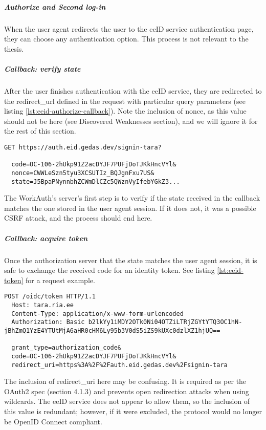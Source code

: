 \subparagraph{Authorize and Second log-in}

When the user agent redirects the user to the eeID service authentication page, they can choose any authentication option. This process is not relevant to the thesis.

\subparagraph{Callback: verify state}

After the user finishes authentication with the eeID service, they are redirected to the redirect\_url defined in the request with particular query parameters (see listing \ref{lst:eeid-authorize-callback}). Note the inclusion of nonce, as this value should not be here \cite{okta-oidc-spec} (see Discovered Weaknesses section), and we will ignore it for the rest of this section.

\begin{lstlisting}[caption={The eeID service authorize redirect response}, label={lst:eeid-authorize-callback}]
  GET https://auth.eid.gedas.dev/signin-tara?
  
  code=OC-106-2hUkp91Z2acDYJF7PUFjDoTJKkHncVYl&
  nonce=CWWLeSzn5tyu3XCSUTIz_BQJgnFxu7US&
  state=J5BpaPNynnbhZCWmDlCZc5QWznVyIfebYGkZ3...
\end{lstlisting}

The WorkAuth's server's first step is to verify if the state received in the callback matches the one stored in the user agent session. If it does not, it was a possible CSRF attack, and the process should end here.

\subparagraph{Callback: acquire token}

Once the authorization server that the state matches the user agent session, it is safe to exchange the received code for an identity token. See listing \ref{lst:eeid-token} for a request example.

\begin{lstlisting}[caption={The eeID service token request}, label={lst:eeid-token}]
  POST /oidc/token HTTP/1.1
  Host: tara.ria.ee
  Content-Type: application/x-www-form-urlencoded
  Authorization: Basic b2lkYy1iMDY2OTk0Ni04OTZiLTRjZGYtYTQ3OC1hN-jBhZmQ1YzE4YTUtMjA6aHR0cHM6Ly95b3V0dS5iZS9kUXc0dzlXZ1hjUQ==

  grant_type=authorization_code&
  code=OC-106-2hUkp91Z2acDYJF7PUFjDoTJKkHncVYl&
  redirect_uri=https%3A%2F%2Fauth.eid.gedas.dev%2Fsignin-tara
\end{lstlisting}

The inclusion of redirect\_uri here may be confusing. It is required as per the OAuth2 spec (section 4.1.3) \cite{rfc6749} and prevents open redirection attacks when using wildcards. The eeID service does not appear to allow them, so the inclusion of this value is redundant; however, if it were excluded, the protocol would no longer be OpenID Connect compliant.

